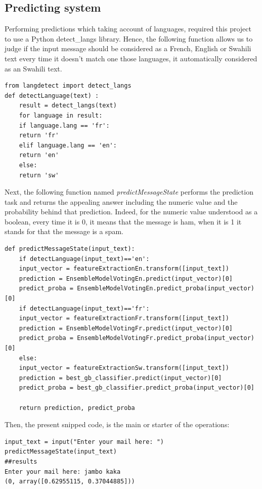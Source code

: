 \documentclass[12pt,a4paper, oneside]{book}
\begin{document}
\subsection{Predicting system }
Performing predictions which taking account of languages, required this project to use a Python detect\_langs library. Hence, the following function allows us to judge if the input message should be considered as a French, English or Swahili text every time it doesn't match one those languages, it automatically considered as an Swahili text.
\begin{lstlisting}[style=stylejupyter]
from langdetect import detect_langs 
def detectLanguage(text) :
	result = detect_langs(text)
	for language in result:
	if language.lang == 'fr':
	return 'fr'
	elif language.lang == 'en':
	return 'en'
	else:
	return 'sw'
\end{lstlisting} 

Next, the following function named \textit{predictMessageState} performs the prediction task and returns the appealing answer including the numeric  value and the probability behind that prediction. Indeed, for the numeric value understood as a boolean, every time it is 0, it means that the message is ham, when it is 1 it stands for that the message is a spam. 
\begin{lstlisting}[style=stylejupyter]
def predictMessageState(input_text):
	if detectLanguage(input_text)=='en':
	input_vector = featureExtractionEn.transform([input_text])
	prediction = EnsembleModelVotingEn.predict(input_vector)[0]
	predict_proba = EnsembleModelVotingEn.predict_proba(input_vector)[0]
	if detectLanguage(input_text)=='fr':
	input_vector = featureExtractionFr.transform([input_text])
	prediction = EnsembleModelVotingFr.predict(input_vector)[0]
	predict_proba = EnsembleModelVotingFr.predict_proba(input_vector)[0]
	else:
	input_vector = featureExtractionSw.transform([input_text])
	prediction = best_gb_classifier.predict(input_vector)[0]
	predict_proba = best_gb_classifier.predict_proba(input_vector)[0] 
	
	return prediction, predict_proba
\end{lstlisting}  

Then, the present snipped code, is the main or starter of the operations: 
\begin{lstlisting}[style=stylejupyter]
input_text = input("Enter your mail here: ") 
predictMessageState(input_text) 
##results
Enter your mail here: jambo kaka
(0, array([0.62955115, 0.37044885]))
\end{lstlisting}
\end{document}
